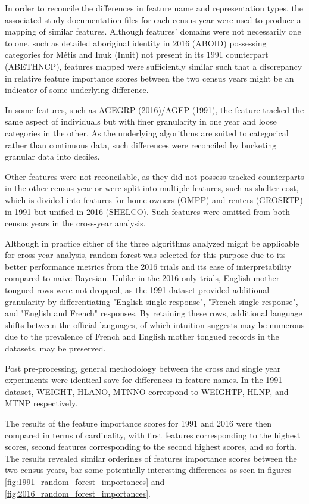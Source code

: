\documentclass[10pt, conference, compsocconf]{IEEEtran}
\begin{document}
In order to reconcile the differences in feature name and representation types, the associated study documentation files for each census year were used to produce a mapping of similar features.  Although features' domains were not necessarily one to one, such as detailed aboriginal identity in 2016 (ABOID) possessing categories for Métis and Inuk (Inuit) not present in its 1991 counterpart (ABETHNCP), features mapped were sufficiently similar such that a discrepancy in relative feature importance scores between the two census years might be an indicator of some underlying difference.

In some features, such as AGEGRP (2016)/AGEP (1991), the feature tracked the same aspect of individuals but with finer granularity in one year and loose categories in the other.  As the underlying algorithms are suited to categorical rather than continuous data, such differences were reconciled by bucketing granular data into deciles.

Other features were not reconcilable, as they did not possess tracked counterparts in the other census year or were split into multiple features, such as shelter cost, which is divided into features for home owners (OMPP) and renters (GROSRTP) in 1991 but unified in 2016 (SHELCO).  Such features were omitted from both census years in the cross-year analysis.

Although in practice either of the three algorithms analyzed might be applicable for cross-year analysis, random forest was selected for this purpose due to its better performance metrics from the 2016 trials and its ease of interpretability compared to naive Bayesian.  Unlike in the 2016 only trials, English mother tongued rows were not dropped, as the 1991 dataset provided additional granularity by differentiating "English single response", "French single response", and "English and French" responses.  By retaining these rows, additional language shifts between the official languages, of which intuition suggests may be numerous due to the prevalence of French and English mother tongued records in the datasets, may be preserved.

Post pre-processing, general methodology between the cross and single year experiments were identical save for differences in feature names.  In the 1991 dataset, WEIGHT, HLANO, MTNNO correspond to WEIGHTP, HLNP, and MTNP respectively.

The results of the feature importance scores for 1991 and 2016 were then compared in terms of cardinality, with first features corresponding to the highest scores, second features corresponding to the second highest scores, and so forth.  The results revealed similar orderings of features importance scores between the two census years, bar some potentially interesting differences as seen in figures \ref{fig:1991_random_forest_importances} and \ref{fig:2016_random_forest_importances}.
\end{document}
